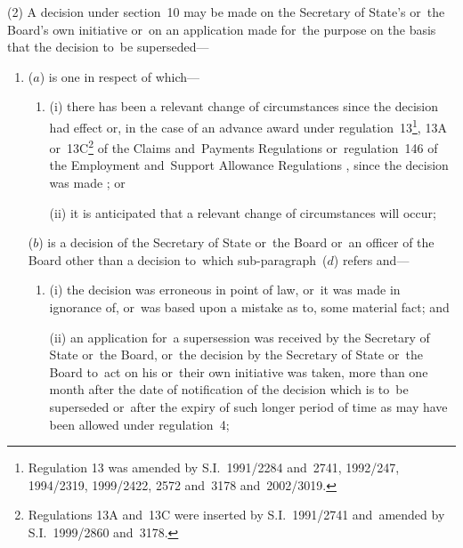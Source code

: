 \documentclass[12pt,a4paper]{article}
\begin{document}
(2) A decision under section~10 may be made on the Secretary of State’s 
or~the Board's  %
own initiative or~on an application made for~the purpose on the basis that the decision to~be superseded—
\begin{enumerate}\item[]
($a$) is one in respect of which—
\begin{enumerate}\item[]
(i) there has been a relevant change of circumstances since the decision 
had effect  %
or, in the case of an advance award under regulation~13\footnote{Regulation 13 was amended by S.I.~1991/2284 and~2741, 1992/247, 1994/2319, 1999/2422, 2572 and~3178 and~2002/3019.}, 13A or~13C\footnote{Regulations 13A and~13C were inserted by S.I.~1991/2741 and~amended by S.I.~1999/2860 and~3178.} of the Claims and~Payments Regulations
or~regulation~146 of the Employment and~Support Allowance Regulations%
, since the decision was made%
; or

(ii) it is anticipated that a relevant change of circumstances will occur;
\end{enumerate}

($b$) is a decision of the Secretary of State 
or~the Board or~an officer of the Board  %
other than a decision to~which sub-paragraph~($d$) refers and—
\begin{enumerate}\item[]
(i) the decision was erroneous in point of law, or~it was made in ignorance of, or~was based upon a mistake as to, some material fact; and

(ii) an application for~a supersession was received by the Secretary of State
or~the Board,  %
or~the decision by the Secretary of State 
or~the Board  %
to~act on his 
or~their  %
own initiative was taken, more than one month after the date of notification of the decision which is to~be superseded or~after the expiry of such longer period of time as may have been allowed under regulation~4;
\end{enumerate}



\end{enumerate}
\end{document}
